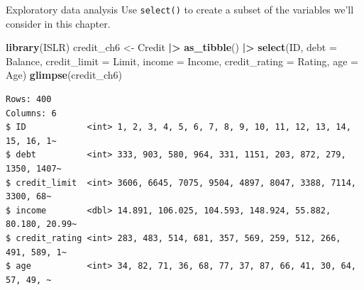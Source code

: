 \documentclass[
  ignorenonframetext,
]{beamer}
\newenvironment{Shaded}{\begin{snugshade}}{\end{snugshade}}
\newcommand{\AttributeTok}[1]{\textcolor[rgb]{0.13,0.29,0.53}{#1}}
\newcommand{\FunctionTok}[1]{\textcolor[rgb]{0.13,0.29,0.53}{\textbf{#1}}}
\newcommand{\NormalTok}[1]{#1}
\newcommand{\OtherTok}[1]{\textcolor[rgb]{0.56,0.35,0.01}{#1}}
\newcommand{\SpecialCharTok}[1]{\textcolor[rgb]{0.81,0.36,0.00}{\textbf{#1}}}
\begin{document}
\begin{frame}[fragile]{Exploratory data analysis}
\label{exploratory-data-analysis-14}
Use \texttt{select()} to create a subset of the variables we'll consider
in this chapter.

\small

\begin{Shaded}
\begin{Highlighting}[]
\FunctionTok{library}\NormalTok{(ISLR)}
\NormalTok{credit\_ch6 }\OtherTok{\textless{}{-}}\NormalTok{ Credit }\SpecialCharTok{|\textgreater{}} 
  \FunctionTok{as\_tibble}\NormalTok{() }\SpecialCharTok{|\textgreater{}} 
  \FunctionTok{select}\NormalTok{(ID, }\AttributeTok{debt =}\NormalTok{ Balance, }\AttributeTok{credit\_limit =}\NormalTok{ Limit, }
         \AttributeTok{income =}\NormalTok{ Income, }\AttributeTok{credit\_rating =}\NormalTok{ Rating, }\AttributeTok{age =}\NormalTok{ Age)}
\FunctionTok{glimpse}\NormalTok{(credit\_ch6)}
\end{Highlighting}
\end{Shaded}

\begin{verbatim}
Rows: 400
Columns: 6
$ ID            <int> 1, 2, 3, 4, 5, 6, 7, 8, 9, 10, 11, 12, 13, 14, 15, 16, 1~
$ debt          <int> 333, 903, 580, 964, 331, 1151, 203, 872, 279, 1350, 1407~
$ credit_limit  <int> 3606, 6645, 7075, 9504, 4897, 8047, 3388, 7114, 3300, 68~
$ income        <dbl> 14.891, 106.025, 104.593, 148.924, 55.882, 80.180, 20.99~
$ credit_rating <int> 283, 483, 514, 681, 357, 569, 259, 512, 266, 491, 589, 1~
$ age           <int> 34, 82, 71, 36, 68, 77, 37, 87, 66, 41, 30, 64, 57, 49, ~
\end{verbatim}

\normalsize
\end{frame}
\end{document}
